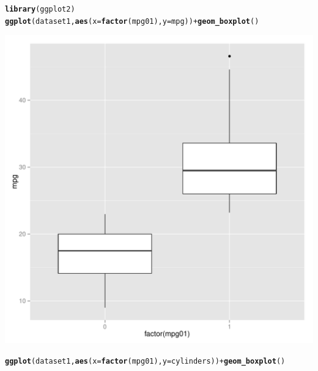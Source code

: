\documentclass{article}\usepackage[]{graphicx}\usepackage[]{color}
\makeatletter
\def\maxwidth{ %
  \ifdim\Gin@nat@width>\linewidth
    \linewidth
  \else
    \Gin@nat@width
  \fi
}
\newcommand{\hlopt}[1]{\textcolor[rgb]{0,0,0}{#1}}%
\newcommand{\hlstd}[1]{\textcolor[rgb]{0.345,0.345,0.345}{#1}}%
\newcommand{\hlkwc}[1]{\textcolor[rgb]{0.333,0.667,0.333}{#1}}%
\newcommand{\hlkwd}[1]{\textcolor[rgb]{0.737,0.353,0.396}{\textbf{#1}}}%
\newenvironment{kframe}{%
 \def\at@end@of@kframe{}%
 \ifinner\ifhmode%
  \def\at@end@of@kframe{\end{minipage}}%
  \begin{minipage}{\columnwidth}%
 \fi\fi%
 \def\FrameCommand##1{\hskip\@totalleftmargin \hskip-\fboxsep
 \colorbox{shadecolor}{##1}\hskip-\fboxsep
     \hskip-\linewidth \hskip-\@totalleftmargin \hskip\columnwidth}%
 \MakeFramed {\advance\hsize-\width
   \@totalleftmargin\z@ \linewidth\hsize
   \@setminipage}}%
 {\par\unskip\endMakeFramed%
 \at@end@of@kframe}
\newenvironment{knitrout}{}{} %
\makeatother
\begin{document}
\begin{enumerate}[(a)]
\begin{knitrout}
\begin{kframe}\begin{alltt}
\hlkwd{library}\hlstd{(ggplot2)}
\hlkwd{ggplot}\hlstd{(dataset1,} \hlkwd{aes}\hlstd{(}\hlkwc{x}\hlstd{=}\hlkwd{factor}\hlstd{(mpg01),} \hlkwc{y}\hlstd{=mpg))}\hlopt{+}\hlkwd{geom_boxplot}\hlstd{()}
\end{alltt}
\end{kframe}
\includegraphics[width=\maxwidth]{figure/unnamed-chunk-7-2} 
\begin{kframe}\begin{alltt}
\hlkwd{ggplot}\hlstd{(dataset1,} \hlkwd{aes}\hlstd{(}\hlkwc{x}\hlstd{=}\hlkwd{factor}\hlstd{(mpg01),} \hlkwc{y}\hlstd{=cylinders))}\hlopt{+}\hlkwd{geom_boxplot}\hlstd{()}
\end{alltt}
\end{kframe}

\end{knitrout}
\end{enumerate}
\end{document}
